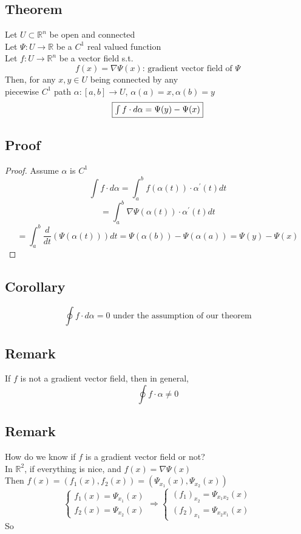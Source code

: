 \documentclass[12pt]{article}
\newcommand{\BR}{\mathbb R}
\newcommand{\prm}{^\prime}
\begin{document}
  \subsection*{Theorem}
    Let $U\subset\BR^n$ be open and connected \\
    Let $\Psi:U\rightarrow\BR$ be a $C^1$ real valued function \\
    Let $f:U\rightarrow\BR^n$ be a vector field s.t. \\
    \[ f(x)=\nabla\Psi(x)\text{: gradient vector field of }\Psi \]
    Then, for any $x,y\in U$ being connected by any \\
    piecewise $C^1$ path $\alpha:[a,b]\rightarrow U$, $\alpha(a)=x,\alpha(b)=y$ \\
    \[ \fbox{$\int f\cdot d\alpha = \Psi(y)-\Psi(x)$} \]
  \subsection*{Proof}
    \begin{proof}
      Assume $\alpha$ is $C^1$ \\
      \[ \int f\cdot d\alpha=\int_a^b f(\alpha(t))\cdot \alpha\prm(t)dt \]
      \[ = \int_a^b\nabla\Psi(\alpha(t))\cdot \alpha\prm(t)dt \]
      \[ = \int_a^b\frac{d}{dt}(\Psi(\alpha(t)))dt=\Psi(\alpha(b))-\Psi(\alpha(a))=\Psi(y)-\Psi(x) \]
    \end{proof}
  \subsection*{Corollary}
    \[ \oint f\cdot d\alpha=0 \text{ under the assumption of our theorem} \]
  \subsection*{Remark}
    If $f$ is not a gradient vector field, then in general, \\
    \[ \oint f\cdot \alpha \neq 0 \]
  \subsection*{Remark}
    How do we know if $f$ is a gradient vector field or not? \\
    In $\BR^2$, if everything is nice, and $f(x)=\nabla\Psi(x)$ \\
    Then $f(x)=(f_1(x),f_2(x))=(\Psi_{x_1}(x),\Psi_{x_2}(x))$ \\
    \begin{equation*}
      \begin{cases}
        f_1(x)=\Psi_{x_1}(x) \\
        f_2(x)=\Psi_{x_2}(x)
      \end{cases}
      \Rightarrow
      \begin{cases}
        (f_1)_{x_2}=\Psi_{x_1x_2}(x) \\
        (f_2)_{x_1}=\Psi_{x_2x_1}(x)
      \end{cases}
    \end{equation*}
    So 
\end{document}
